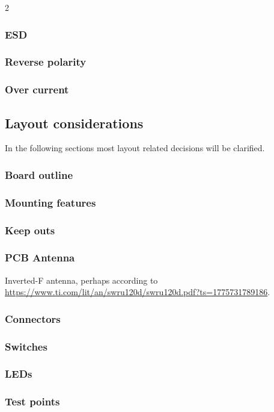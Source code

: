 \documentclass[11px]{specification}
\begin{document}
\begin{multicols}{2}
\subsubsection{ESD}
\subsubsection{Reverse polarity}
\subsubsection{Over current}

\subsection{Layout considerations}
In the following sections most layout related decisions will be clarified.
\subsubsection{Board outline}
\subsubsection{Mounting features}
\subsubsection{Keep outs}
\subsubsection{PCB Antenna}
\label{sec:PCB-Antenna}
Inverted-F antenna, perhaps according to \url{https://www.ti.com/lit/an/swru120d/swru120d.pdf?ts=1775731789186}.
\subsubsection{Connectors}
\subsubsection{Switches}
\subsubsection{LEDs}
\subsubsection{Test points}

\end{multicols}
\end{document}

